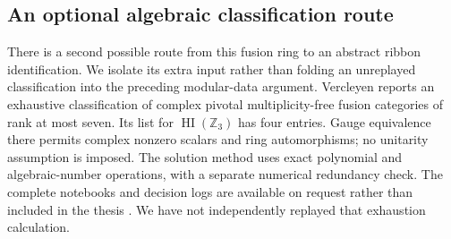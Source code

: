 \documentclass[11pt,a4paper]{article}
\theoremstyle{definition}
\begin{document}
\subsection{An optional algebraic classification route}

There is a second possible route from this fusion ring to an abstract
ribbon identification. We isolate its extra input rather than folding
an unreplayed classification into the preceding modular-data argument.
Vercleyen \cite[Section~4.4 and Table~9.1, p.~171]{Vercleyen} reports an
exhaustive classification of complex pivotal multiplicity-free fusion
categories of rank at most seven. Its list for $\operatorname{HI}(\mathbb
Z_3)$ has four entries. Gauge equivalence there permits complex nonzero
scalars and ring automorphisms; no unitarity assumption is imposed.
The solution method uses exact polynomial and algebraic-number
operations, with a separate numerical redundancy check. The complete
notebooks and decision logs are available on request rather than
included in the thesis \cite[Sections~4.1.7--4.1.8 and~4.4.1]{Vercleyen}.
We have not independently replayed that exhaustion calculation.
\end{document}
